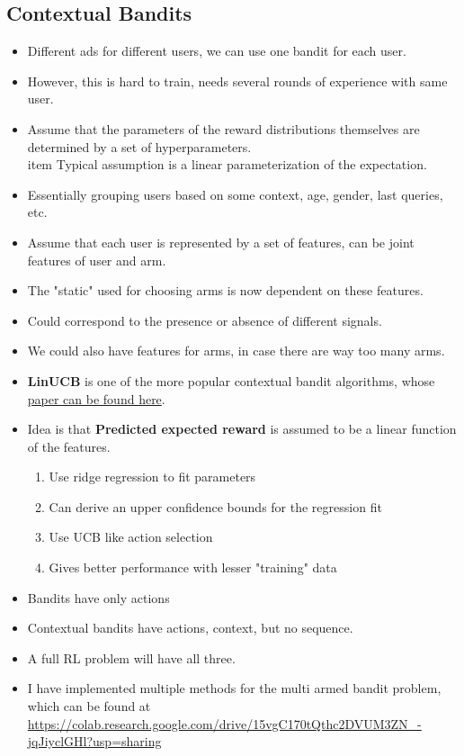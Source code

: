 \documentclass[a4paper]{article}
\begin{document}
\subsection{Contextual Bandits}
\begin{itemize}
    \item Different ads for different users, we can use one bandit for each user.
    \item However, this is hard to train, needs several rounds of experience with same user.
    \item Assume that the parameters of the reward distributions themselves are determined by a set of hyperparameters.
    \\item Typical assumption is a linear parameterization of the expectation.
    \item Essentially grouping users based on some context, age, gender, last queries, etc.
    \item Assume that each user is represented by a set of features, can be joint features of user and arm.
    \item The "static" used for choosing arms is now dependent on these features.
    \item Could correspond to the presence or absence of different signals.
    \item We could also have features for arms, in case there are way too many arms.
    \item \textbf{LinUCB} is one of the more popular contextual bandit algorithms, whose \href{https://arxiv.org/pdf/1003.0146}{paper can be found here}.
    \item Idea is that \textbf{Predicted expected reward} is assumed to be a linear function of the features.
    \begin{enumerate}
        \item Use ridge regression to fit parameters
        \item Can derive an upper confidence bounds for the regression fit
        \item Use UCB like action selection
        \item Gives better performance with lesser "training" data
    \end{enumerate}
    \item Bandits have only actions
    \item Contextual bandits have actions, context, but no sequence.
    \item A full RL problem will have all three.
    \item I have implemented multiple methods for the multi armed bandit problem, which can be found at \url{https://colab.research.google.com/drive/15vgC170tQthc2DVUM3ZN_-jqJiyclGHl?usp=sharing}
\end{itemize}
\end{document}
